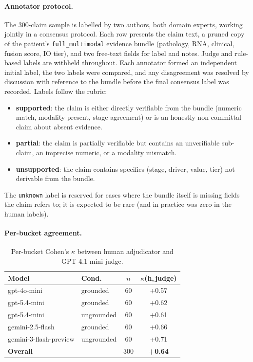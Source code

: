 \documentclass{article}
\theoremstyle{plain}
\begin{document}
\paragraph{Annotator protocol.} The 300-claim sample is labelled by two authors, both domain experts, working jointly in a consensus protocol. Each row presents the claim text, a pruned copy of the patient's \texttt{full\_multimodal} evidence bundle (pathology, RNA, clinical, fusion score, IO tier), and two free-text fields for label and notes. Judge and rule-based labels are withheld throughout. Each annotator formed an independent initial label, the two labels were compared, and any disagreement was resolved by discussion with reference to the bundle before the final consensus label was recorded. Labels follow the rubric:
\begin{itemize}
\item \textbf{supported}: the claim is either directly verifiable from the bundle (numeric match, modality present, stage agreement) or is an honestly non-committal claim about absent evidence.
\item \textbf{partial}: the claim is partially verifiable but contains an unverifiable sub-claim, an imprecise numeric, or a modality mismatch.
\item \textbf{unsupported}: the claim contains specifics (stage, driver, value, tier) not derivable from the bundle.
\end{itemize}
The \texttt{unknown} label is reserved for cases where the bundle itself is missing fields the claim refers to; it is expected to be rare (and in practice was zero in the human labels).

\paragraph{Per-bucket agreement.}

\begin{table}[h]
\centering
\small
\begin{tabular}{llcc}
\toprule
\textbf{Model} & \textbf{Cond.} & $n$ & \textbf{$\kappa$(h,\,judge)} \\
\midrule
gpt-4o-mini            & grounded   & 60 & +0.57 \\
gpt-5.4-mini           & grounded   & 60 & +0.62 \\
gpt-5.4-mini           & ungrounded & 60 & +0.61 \\
gemini-2.5-flash       & grounded   & 60 & +0.66 \\
gemini-3-flash-preview & ungrounded & 60 & +0.71 \\
\midrule
\textbf{Overall}       &            & 300 & \textbf{+0.64} \\
\bottomrule
\end{tabular}
\caption{Per-bucket Cohen's $\kappa$ between human adjudicator and GPT-4.1-mini judge.}
\label{tab:perbucket}
\end{table}
\end{document}
